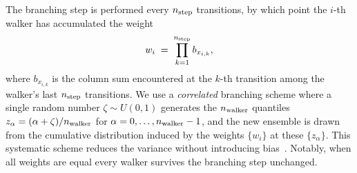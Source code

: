 \documentclass{SciPost}
\newcommand{\nbra}{n_{\rm step}}
\newcommand{\nwalker}{n_{\rm walker}}
\begin{document}
The branching step is performed every $\nbra$ transitions, by which point the $i$-th walker has accumulated the weight
\begin{align}
	w_i \;=\; \prod_{k=1}^{\nbra} b_{x_{i,k}},
\end{align}
where $b_{x_{i,k}}$ is the column sum encountered at the $k$-th transition among the walker's last $\nbra$ transitions.
%
We use a \emph{correlated} branching scheme where a single random number $\zeta \sim U(0,1)$ generates the $\nwalker$ quantiles $z_\alpha = (\alpha + \zeta)/\nwalker$ for $\alpha = 0, \dots, \nwalker - 1$, and the new ensemble is drawn from the cumulative distribution induced by the weights $\{w_i\}$ at these $\{z_\alpha\}$.
%
This systematic scheme reduces the variance without introducing bias~\cite{calandra_numerical_1998,becca_quantum_2017}.
%
Notably, when all weights are equal every walker survives the branching step unchanged.
\end{document}
